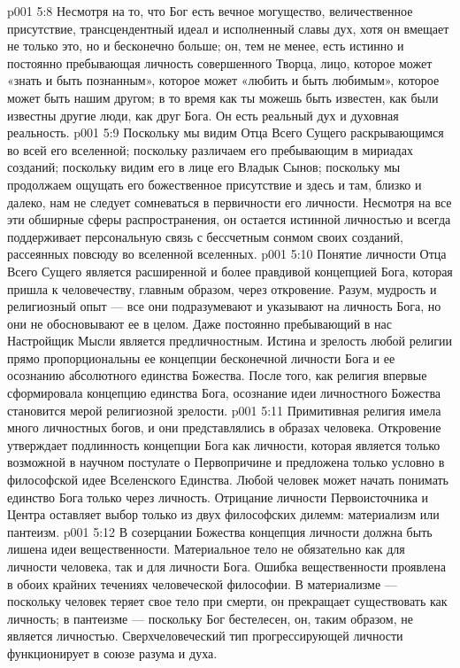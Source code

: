 \vs p001 5:8 \pc Несмотря на то, что Бог есть вечное могущество, величественное присутствие, трансцендентный идеал и исполненный славы дух, хотя он вмещает не только это, но и бесконечно больше; он, тем не менее, есть истинно и постоянно пребывающая личность совершенного Творца, лицо, которое может «знать и быть познанным», которое может «любить и быть любимым», которое может быть нашим другом; в то время как ты можешь быть известен, как были известны другие люди, как друг Бога. Он есть реальный дух и духовная реальность.
\vs p001 5:9 Поскольку мы видим Отца Всего Сущего раскрывающимся во всей его вселенной; поскольку различаем его пребывающим в мириадах созданий; поскольку видим его в лице его Владык Сынов; поскольку мы продолжаем ощущать его божественное присутствие и здесь и там, близко и далеко, нам не следует сомневаться в первичности его личности. Несмотря на все эти обширные сферы распространения, он остается истинной личностью и всегда поддерживает персональную связь с бессчетным сонмом своих созданий, рассеянных повсюду во вселенной вселенных.
\vs p001 5:10 \pc Понятие личности Отца Всего Сущего является расширенной и более правдивой концепцией Бога, которая пришла к человечеству, главным образом, через откровение. Разум, мудрость и религиозный опыт --- все они подразумевают и указывают на личность Бога, но они не обосновывают ее в целом. Даже постоянно пребывающий в нас Настройщик Мысли является предличностным. Истина и зрелость любой религии прямо пропорциональны ее концепции бесконечной личности Бога и ее осознанию абсолютного единства Божества. После того, как религия впервые сформировала концепцию единства Бога, осознание идеи личностного Божества становится мерой религиозной зрелости.
\vs p001 5:11 Примитивная религия имела много личностных богов, и они представлялись в образах человека. Откровение утверждает подлинность концепции Бога как личности, которая является только возможной в научном постулате о Первопричине и предложена только условно в философской идее Вселенского Единства. Любой человек может начать понимать единство Бога только через личность. Отрицание личности Первоисточника и Центра оставляет выбор только из двух философских дилемм: материализм или пантеизм.
\vs p001 5:12 В созерцании Божества концепция личности должна быть лишена идеи вещественности. Материальное тело не обязательно как для личности человека, так и для личности Бога. Ошибка вещественности проявлена в обоих крайних течениях человеческой философии. В материализме --- поскольку человек теряет свое тело при смерти, он прекращает существовать как личность; в пантеизме --- поскольку Бог бестелесен, он, таким образом, не является личностью. Сверхчеловеческий тип прогрессирующей личности функционирует в союзе разума и духа.
